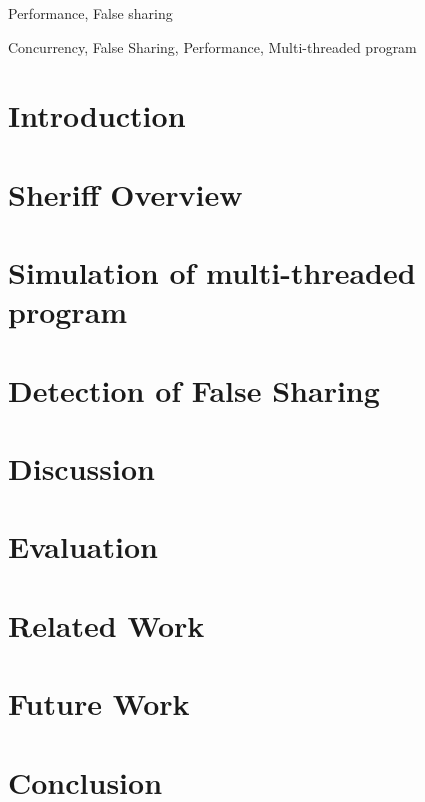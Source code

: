 \documentclass[10pt]{sigplanconf}
\begin{document}
\begin{abstract}

\end{abstract}

\terms
Performance, False sharing

\keywords
Concurrency, False Sharing, Performance, Multi-threaded program


\section{Introduction}



\section{Sheriff Overview}


\section{Simulation of multi-threaded program}


\section{Detection of False Sharing}


\section{Discussion}


\section{Evaluation}


\section{Related Work}


\section{Future Work}

\label{sec:future}
\begin{comment}
(1) Pinpoint the line number to access the cache line by using the "watch point" technique. \\
(2) Figure out the problem caused by read-write false sharing problem by using the "watch point" technique. \\
(3) Design a run-time system which can tolerate the false sharing problem in a very low overhead. Profiling
on specified input should be very helpful to find the problem.
\end{comment}

\section{Conclusion}

{
\small


}
\end{document}
